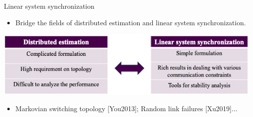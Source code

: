 \documentclass[10pt]{beamer}
\DeclareMathOperator{\1}{\textbf{1}}
\begin{document}
	  \begin{frame}{Linear system synchronization}
	    \begin{itemize}
	      \item Bridge the fields of distributed estimation and linear system synchronization.
	    \end{itemize}
	    \includegraphics[width=1\textwidth]{pic/bridge}
	    \begin{itemize}
	      \item Markovian switching topology [You2013]; Random link failures [Xu2019]...
	    \end{itemize}
	  \end{frame}
\end{document}
